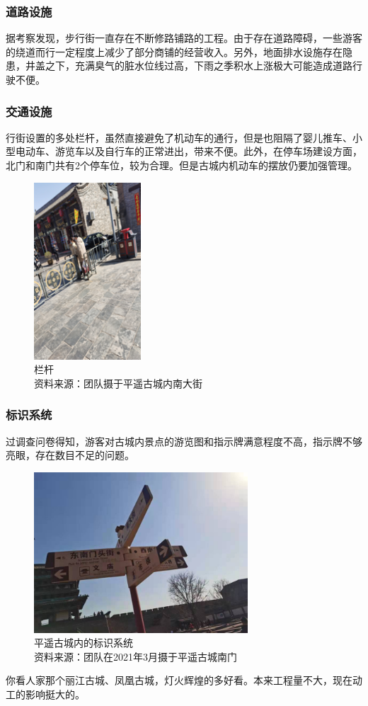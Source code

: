 \documentclass[UTF8]{ctexart}
\begin{document}
        \subsubsection{道路设施}
        据考察发现，步行街一直存在不断修路铺路的工程。由于存在道路障碍，一些游客的绕道而行一定程度上减少了部分商铺的经营收入。另外，地面排水设施存在隐患，井盖之下，充满臭气的脏水位线过高，下雨之季积水上涨极大可能造成道路行驶不便。
        \subsubsection{交通设施}
        行街设置的多处栏杆，虽然直接避免了机动车的通行，但是也阻隔了婴儿推车、小型电动车、游览车以及自行车的正常进出，带来不便。此外，在停车场建设方面，北门和南门共有2个停车位，较为合理。但是古城内机动车的摆放仍要加强管理。
        \begin{figure}[H]
            \centering
            \includegraphics[width=4cm]{图片 10.png}
            \caption[plain]{栏杆\\资料来源：团队摄于平遥古城内南大街}
    
        \end{figure}
        \subsubsection{标识系统}
        过调查问卷得知，游客对古城内景点的游览图和指示牌满意程度不高，指示牌不够亮眼，存在数目不足的问题。
        \begin{figure}[H]
            \centering
            \includegraphics[width=8cm]{标识.jpg}
            \caption[plain]{平遥古城内的标识系统\\资料来源：团队在2021年3月摄于平遥古城南门}
    
        \end{figure}
        你看人家那个丽江古城、凤凰古城，灯火辉煌的多好看。本来工程量不大，现在动工的影响挺大的。
        
\end{document}

